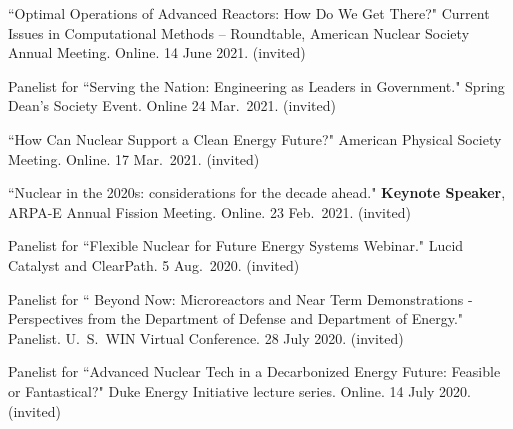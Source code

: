 \begin{bibsection}
\item ``Optimal Operations of Advanced Reactors: How Do We Get There?" Current Issues in Computational Methods -- Roundtable, American Nuclear Society Annual Meeting. Online. 14 June 2021. (invited)


\item Panelist for ``Serving the Nation: Engineering as Leaders in Government." Spring Dean's Society Event. Online 24 Mar.\ 2021. (invited)

\item ``How Can Nuclear Support a Clean Energy Future?"  American Physical Society Meeting. Online. 17 Mar.\ 2021. (invited)

\item ``Nuclear in the 2020s: considerations for the decade ahead." \textbf{Keynote Speaker}, ARPA-E Annual Fission Meeting. Online. 23 Feb.\ 2021. (invited)




\item Panelist for ``Flexible Nuclear for Future Energy
Systems Webinar." Lucid Catalyst and ClearPath. 5 Aug.\ 2020. (invited) 

\item Panelist for `` Beyond Now: Microreactors and Near Term Demonstrations - Perspectives from
the Department of Defense and Department of Energy." Panelist. U.\ S.\ WIN Virtual
Conference. 28 July 2020. (invited) 

\item Panelist for ``Advanced Nuclear Tech in a Decarbonized Energy Future:
Feasible or Fantastical?" Duke Energy Initiative lecture series.
Online. 14 July 2020. (invited)



\end{bibsection}
